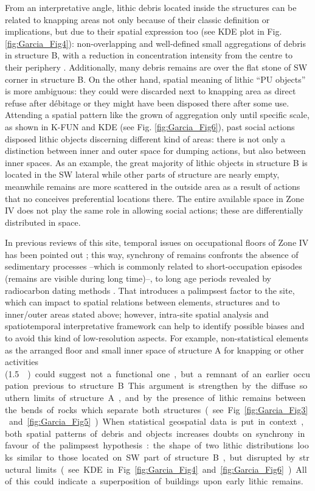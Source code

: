 From an interpretative angle, lithic debris located inside the structures can be related to knapping areas not only because of their classic definition or implications, but due to their spatial expression too (see KDE plot in Fig. \ref{fig:Garcia_Fig4}): non-overlapping and well-defined small aggregations of debris in structure B, with a reduction in concentration intensity from the centre to their periphery \parencites[e.g.][]{Kvamme_1997}{Nadel_2001}{Newcomer_1980}. Additionally, many debris remains are over the flat stone of SW corner in structure B. On the  other hand, spatial meaning of lithic “PU objects” is more ambiguous: they could were discarded next to knapping area as direct refuse after débitage or they might have been disposed there after some use. Attending a spatial pattern like the grown of aggregation only until specific scale, as shown in K-FUN and KDE (see Fig. \ref{fig:Garcia_Fig6}), past social actions disposed lithic objects discerning different kind of areas: there is not only a distinction between inner and outer space for dumping actions, but also between inner spaces. As an example, the great majority of lithic objects in structure B is located in the SW lateral while other parts of structure are nearly empty, meanwhile remains are more scattered in the outside area as a result of actions that no conceives preferential locations there. The entire available space in Zone IV does not play the same role in allowing social actions; these are differentially distributed in space.

In previous reviews of this site, temporal issues on occupational floors of Zone IV has been pointed out \parencite[see][]{Arias_2011}; this way, synchrony of remains confronts the absence of sedimentary processes –which is commonly related to short-occupation episodes (remains are visible during long time)–, to long age periods revealed by radiocarbon dating methods \parencite[35--39]{Arias_2011}. That introduces a palimpsest factor to the site, which can impact to spatial relations between elements, structures and to inner/outer areas stated above; however, intra-site spatial analysis and spatiotemporal interpretative framework can help to identify possible biases and to avoid this kind of low-resolution aspects. For example, non-statistical elements as the arranged floor and small inner space of structure A for knapping or other activities (\SI{1.5}{\metre\square}) could suggest not a functional one, but a remnant of an earlier occupation previous to structure B. This argument is strengthen by the diffuse southern limits of structure A, and by the presence of lithic remains between the bends of rocks which separate both structures (see Fig. \ref{fig:Garcia_Fig3} and \ref{fig:Garcia_Fig5}). When statistical geospatial data is put in context, both spatial patterns of debris and objects increases doubts on synchrony in favour of the palimpsest hypothesis: the shape of two lithic distributions looks similar to those located on SW part of structure B, but disrupted by structural limits (see KDE in Fig. \ref{fig:Garcia_Fig4} and \ref{fig:Garcia_Fig6}). All of this could indicate a superposition of buildings upon early lithic remains. 

